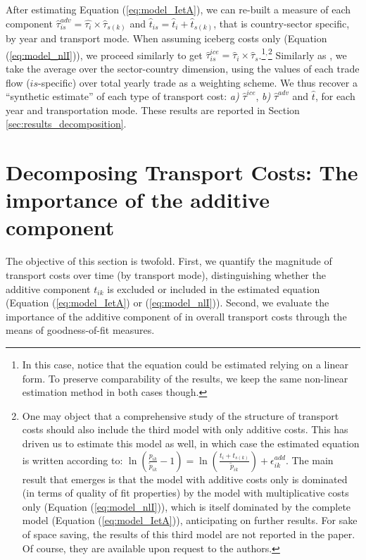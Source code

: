 \documentclass[a4paper,11pt]{article}
\begin{document}
After estimating Equation (\ref{eq:model_IetA}), we can re-built a measure of each component $\widehat{\tau}^{adv}_{is} = \widehat{\tau_{i}} \times \widehat{\tau}_{s(k)}$ and $\widehat{t}_{is} = \widehat{t}_{i} + \widehat{t}_{s(k)}$, that is country-sector specific, by year and transport mode. When assuming iceberg costs only (Equation (\ref{eq:model_nlI})), we proceed similarly to get $\widehat{\tau}^{ice}_{is} = \widehat{\tau}_{i} \times \widehat{\tau}_{s}$.\footnote{In this case, notice that the equation could be estimated relying on a linear form. To preserve comparability of the results, we keep the same non-linear estimation method in both cases though.}$^{,}$\footnote{One may object that a comprehensive study of the structure of transport costs should also include the third model with only additive costs. This has driven us to estimate this model as well, in which case the estimated equation is written according to: $\ln\left(\frac{p_{ik}}{\widetilde{p}_{ik}}-1 \right)= \ln \left(\frac{t_{i} + t_{s(k)}}{\widetilde{p}_{ik}}\right) + \epsilon^{add}_{ik}$. The main result that emerges is that the model with additive costs only is dominated (in terms of quality of fit properties) by the model with multiplicative costs only (Equation (\ref{eq:model_nlI})), which is itself dominated by the complete model (Equation (\ref{eq:model_IetA})), anticipating on further results. For sake of space saving, the results of this third model are not reported in the paper. Of course, they are available upon request to the authors.} Similarly as \citet{Irrazabal_2015}, we take the average over the sector-country dimension, using the values of each trade flow ($is$-specific) over total yearly trade as a weighting scheme. We thus recover a ``synthetic estimate'' of each type of transport cost: \textit{a)} $\widehat{\tau}^{ice}$, \textit{b)} $\widehat{\tau}^{adv}$ and $\widehat{t}$, for each year and transportation mode. These results are reported in Section \ref{sec:results_decomposition}.



\section{Decomposing Transport Costs: The importance of the additive component \label{sec:results_decomposition}}

The objective of this section is twofold. First, we quantify the magnitude of transport costs over time (by transport mode), distinguishing whether the additive component $t_{ik}$ is excluded or included in the estimated equation (Equation (\ref{eq:model_IetA}) or (\ref{eq:model_nlI})). Second, we evaluate the importance of the additive component of in overall transport costs through the means of goodness-of-fit measures.
\end{document}
